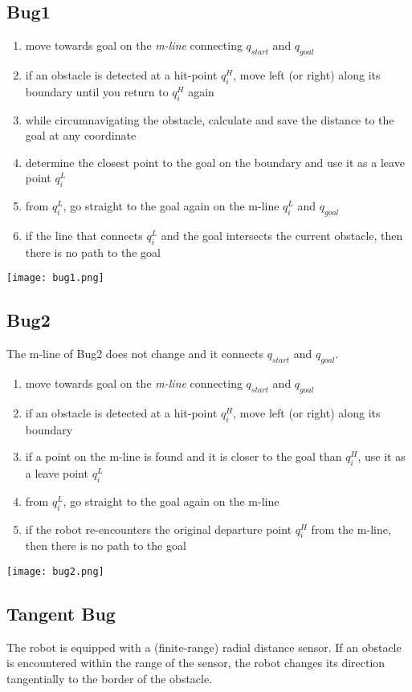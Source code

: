 \begin{multicols*}{2}
\subsection{Bug1}
\begin{enumerate}
	\item move towards goal on the \textit{m-line} connecting $q_{start}$ and $q_{goal}$
	\item if an obstacle is detected at a hit-point $q^H_i$, move left (or right) along its boundary until you return to $q^H_i$ again
	\item while circumnavigating the obstacle, calculate and save the distance to the goal at any coordinate
	\item determine the closest point to the goal on the boundary and use it as a leave point $q^L_i$
	\item from $q^L_i$, go straight to the goal again on the m-line $q^L_i$ and $q_{goal}$
	\item if the line that connects $q^L_i$ and the goal intersects the current obstacle, then there is no path to the goal
\end{enumerate}
\texttt{[image: bug1.png]}



\subsection{Bug2}
The m-line of Bug2 does not change and it connects $q_{start}$ and $q_{goal}$.
\begin{enumerate}
	\item move towards goal on the \textit{m-line} connecting $q_{start}$ and $q_{goal}$
	\item if an obstacle is detected at a hit-point $q^H_i$, move left (or right) along its boundary
	\item if a point on the m-line is found and it is closer to the goal than $q^H_i$, use it as a leave point $q^L_i$
	\item from $q^L_i$, go straight to the goal again on the m-line
	\item if the robot re-encounters the original departure point $q^H_i$ from the m-line, then there is no path to the goal
\end{enumerate}
\texttt{[image: bug2.png]}

\subsection{Tangent Bug}
The robot is equipped with a (finite-range) radial distance sensor. If an obstacle is encountered within the range of the sensor, the robot changes its direction tangentially to the border of the obstacle.


\end{multicols*}
